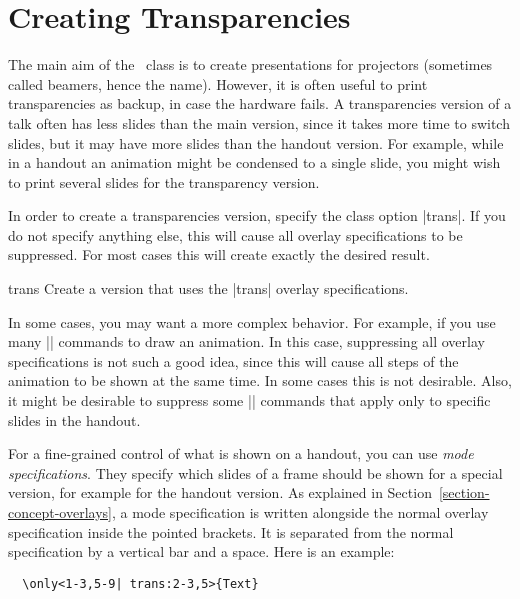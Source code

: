 %
%
%


\section{Creating Transparencies}
\label{section-trans}
\label{trans}

The main aim of the \beamer\ class is to create presentations for projectors (sometimes called beamers, hence the name). However, it is often useful to print transparencies as backup, in case the hardware fails. A transparencies version of a talk often has less slides than the main version, since it takes more time to switch slides, but it may have more slides than the handout version. For example, while in a handout an animation might be condensed to a single slide, you might wish to print several slides for the transparency version.

In order to create a transparencies version, specify the class option |trans|. If you do not specify anything else, this will cause all overlay specifications to be suppressed. For most cases this will create exactly the desired result.

\begin{classoption}{trans}
  Create a version that uses the |trans| overlay specifications.
\end{classoption}

In some cases, you may want a more complex behavior. For example, if you use many |\only| commands to draw an animation. In this case, suppressing all overlay specifications is not such a good idea, since this will cause all steps of the animation to be shown at the same time. In some cases this is not desirable. Also, it might be desirable to suppress some |\alert| commands that apply only to specific slides in the handout.

For a fine-grained control of what is shown on a handout, you can use \emph{mode specifications}. They specify which slides of a frame should be shown for a special version, for example for the handout version. As explained in Section~\ref{section-concept-overlays}, a mode specification is written alongside the normal overlay specification inside the pointed brackets. It is separated from the normal specification by a vertical bar and a space. Here is an example:
\begin{verbatim}
  \only<1-3,5-9| trans:2-3,5>{Text}
\end{verbatim}

